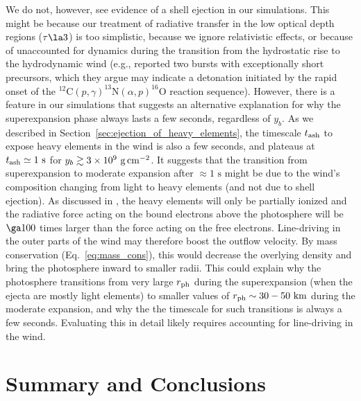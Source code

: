 \documentclass[apj,usenatbib, iop, twocolappendix]{emulateapj}
\newcommand{\trm}[1]{\textrm{#1}}
\begin{document}
We do not, however, see evidence of a shell ejection in our simulations.  This might be because our treatment of radiative transfer in the low optical depth regions ($\tau \la 3$) is too simplistic, because we ignore relativistic effects, or because of unaccounted for dynamics during the transition from the hydrostatic rise to the hydrodynamic wind  (e.g., \citealt{intZand:14} reported two bursts with exceptionally short precursors, which they argue may indicate a detonation initiated by the rapid onset of the $^{12}\trm{C}(p,\gamma)^{13}\trm{N}(\alpha,p)^{16}\trm{O}$ reaction sequence).   However, there is a feature in our simulations that suggests an alternative explanation for why the superexpansion phase always lasts a few seconds, regardless of $y_b$.  As we described in Section~\ref{sec:ejection_of_heavy_elements}, the timescale $t_{\rm ash}$ to expose heavy elements in the wind is also a few seconds, and plateaus at $t_{\rm ash}\simeq 1\trm{ s}$ for $y_b\gtrsim 3\times10^9\ {\rm g\,cm^{-2}}$.  It suggests that the transition from superexpansion to moderate expansion after $\approx 1\trm{ s}$  might be due to the wind's composition changing from light to heavy elements (and not due to shell ejection). As discussed in , the heavy elements will only be partially ionized and the radiative force  acting on the bound electrons above the photosphere will be $\ga 100$ times larger than the force acting on the free electrons.  Line-driving in the outer parts of the wind may therefore boost the outflow velocity.  By mass conservation (Eq.~\ref{eq:mass_cons}), this would decrease the overlying density and bring the photosphere inward to smaller radii.  This could explain why the photosphere transitions from very large $r_{\rm ph}$ during the superexpansion (when the ejecta are mostly light elements) to smaller values of $r_{\rm ph}\sim 30-50\trm{ km}$ during the moderate expansion, and why the the timescale for such transitions is always a few seconds. Evaluating this in detail likely requires accounting for line-driving in the wind.

\section{Summary and Conclusions}
\label{sec:summary}
\end{document}

